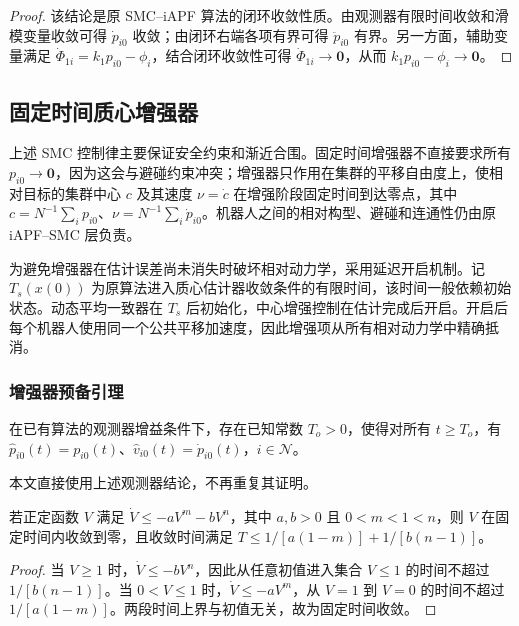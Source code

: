 \begin{proof}
该结论是原 SMC--iAPF 算法的闭环收敛性质。由观测器有限时间收敛和滑模变量收敛可得 $\dot p_{i0}$ 收敛；由闭环右端各项有界可得 $\ddot p_{i0}$ 有界。另一方面，辅助变量满足 $\dot\Phi_{1i}=k_1p_{i0}-\phi_i$，结合闭环收敛性可得 $\dot\Phi_{1i}\to\mathbf{0}$，从而 $k_1p_{i0}-\phi_i\to\mathbf{0}$。
\end{proof}


\subsection{固定时间质心增强器}

上述 SMC 控制律主要保证安全约束和渐近合围。固定时间增强器不直接要求所有 $p_{i0}\to\mathbf{0}$，因为这会与避碰约束冲突；增强器只作用在集群的平移自由度上，使相对目标的集群中心 $c$ 及其速度 $\nu=\dot c$ 在增强阶段固定时间到达零点，其中 $c=N^{-1}\sum_i p_{i0}$、$\nu=N^{-1}\sum_i\dot p_{i0}$。机器人之间的相对构型、避碰和连通性仍由原 iAPF--SMC 层负责。

为避免增强器在估计误差尚未消失时破坏相对动力学，采用延迟开启机制。记 $T_s(x(0))$ 为原算法进入质心估计器收敛条件的有限时间，该时间一般依赖初始状态。动态平均一致器在 $T_s$ 后初始化，中心增强控制在估计完成后开启。开启后每个机器人使用同一个公共平移加速度，因此增强项从所有相对动力学中精确抵消。

\subsubsection{增强器预备引理}

\begin{lemma}[观测器有限时间收敛]
在已有算法的观测器增益条件下，存在已知常数 $T_o>0$，使得对所有 $t\geq T_o$，有 $\hat p_{i0}(t)=p_{i0}(t)$、$\hat v_{i0}(t)=\dot p_{i0}(t)$，$i\in\mathcal{N}$。
\end{lemma}

本文直接使用上述观测器结论，不再重复其证明。

\begin{lemma}
若正定函数 $V$ 满足 $\dot V\leq-aV^m-bV^n$，其中 $a,b>0$ 且 $0<m<1<n$，则 $V$ 在固定时间内收敛到零，且收敛时间满足 $T\leq 1/[a(1-m)]+1/[b(n-1)]$。
\end{lemma}

\begin{proof}
当 $V\geq1$ 时，$\dot V\leq-bV^n$，因此从任意初值进入集合 $V\leq1$ 的时间不超过 $1/[b(n-1)]$。当 $0<V\leq1$ 时，$\dot V\leq-aV^m$，从 $V=1$ 到 $V=0$ 的时间不超过 $1/[a(1-m)]$。两段时间上界与初值无关，故为固定时间收敛。
\end{proof}


